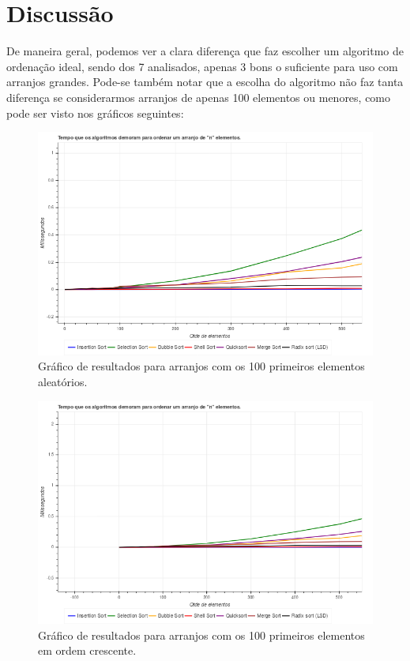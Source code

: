 \chapter{Discussão}
De maneira geral, podemos ver a clara diferença que faz escolher um algoritmo de ordenação ideal, sendo dos 7 analisados, apenas 3 bons o suficiente para uso com arranjos grandes. Pode-se também notar que a escolha do algoritmo não faz tanta diferença se considerarmos arranjos de apenas 100 elementos ou menores, como pode ser visto nos gráficos seguintes:

\begin{figure}[H]
	\centering
	\includegraphics[scale=0.6]{img/igualdade/aleatorios.png}
	\caption{Gráfico de resultados para arranjos com os 100 primeiros elementos aleatórios.}
	\label{graph-aleatorio-comp}
\end{figure}

\begin{figure}[H]
	\centering
	\includegraphics[scale=0.6]{img/igualdade/crescentes.png}
	\caption{Gráfico de resultados para arranjos com os 100 primeiros elementos em ordem crescente.}
	\label{graph-crescente-comp}
\end{figure}

